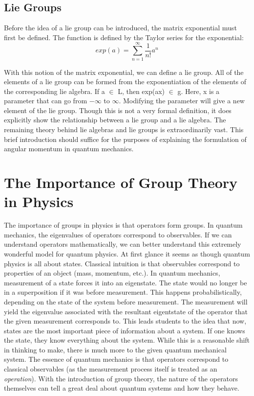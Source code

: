 \documentclass{article}
\begin{document}
\subsection{Lie Groups}
Before the idea of a lie group can be introduced, the matrix exponential must first be defined. The function is defined by the Taylor series for the exponential:
\begin{equation}
exp(a) = \sum_{n=1}^{\infty} \frac{1}{n!} a^{n}
\end{equation}

With this notion of the matrix exponential, we can define a lie group. All of the elements of a lie group can be formed from the exponentiation of the elements of the corresponding lie algebra. If a $\in$ L, then exp(ax) $\in$ g. Here, x is a parameter that can go from $-\infty$ to $\infty$. Modifying the parameter will give a new element of the lie group. Though this is not a very formal definition, it does explicitly show the relationship between a lie group and a lie algebra. The remaining theory behind lie algebras and lie groups is extraordinarily vast. This brief introduction should suffice for the purposes of explaining the formulation of angular momentum in quantum mechanics.


\section{The Importance of Group Theory in Physics}
The importance of groups in physics is that operators form groups. In quantum mechanics, the eigenvalues of operators correspond to observables. If we can understand operators mathematically, we can better understand this extremely wonderful model for quantum physics. At first glance it seems as though quantum physics is all about states. Classical intuition is that observables correspond to properties of an object (mass, momentum, etc.). In quantum mechanics, measurement of a state forces it into an eigenstate. The state would no longer be in a superposition if it was before measurement. This happens probabilistically, depending on the state of the system before measurement. The measurement will yield the eigenvalue associated with the resultant eigentstate of the operator that the given measurement corresponds to. This leads students to the idea that now, states are the most important piece of information about a system. If one knows the state, they know everything about the system. While this is a reasonable shift in thinking to make, there is much more to the given quantum mechanical system. The essence of quantum mechanics is that operators correspond to classical observables (as the measurement process itself is treated as an \textit{operation}). With the introduction of group theory, the nature of the operators themselves can tell a great deal about quantum systems and how they behave. 
\end{document}
